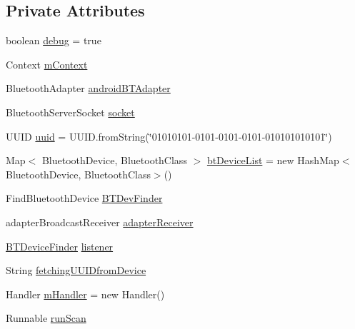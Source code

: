 \subsection*{Private Attributes}
\begin{DoxyCompactItemize}
\item 
boolean \hyperlink{classcom_1_1copelabs_1_1oiframework_1_1bt_1_1_bluetooth_manager_a51e8d0ab632d799f5b0a9b4136715b45}{debug} = true
\item 
Context \hyperlink{classcom_1_1copelabs_1_1oiframework_1_1bt_1_1_bluetooth_manager_a92b524343ac2cdf6f644661e899f80fc}{m\+Context}
\item 
Bluetooth\+Adapter \hyperlink{classcom_1_1copelabs_1_1oiframework_1_1bt_1_1_bluetooth_manager_a52d0ce55f573bd974f3badaf9e15ea21}{android\+B\+T\+Adapter}
\item 
Bluetooth\+Server\+Socket \hyperlink{classcom_1_1copelabs_1_1oiframework_1_1bt_1_1_bluetooth_manager_a76e2d36a98cc7630bffaa92c961dd8b3}{socket}
\item 
U\+U\+I\+D \hyperlink{classcom_1_1copelabs_1_1oiframework_1_1bt_1_1_bluetooth_manager_a952650efe65f696e04b4a3a780db7c87}{uuid} = U\+U\+I\+D.\+from\+String(\char`\"{}01010101-\/0101-\/0101-\/0101-\/010101010101\char`\"{})
\item 
Map$<$ Bluetooth\+Device, Bluetooth\+Class $>$ \hyperlink{classcom_1_1copelabs_1_1oiframework_1_1bt_1_1_bluetooth_manager_aabe213a55c84a108a9856ee520bec579}{bt\+Device\+List} = new Hash\+Map$<$Bluetooth\+Device, Bluetooth\+Class$>$()
\item 
Find\+Bluetooth\+Device \hyperlink{classcom_1_1copelabs_1_1oiframework_1_1bt_1_1_bluetooth_manager_a7d9392823dae98fc2b98356ecc6bd583}{B\+T\+Dev\+Finder}
\item 
adapter\+Broadcast\+Receiver \hyperlink{classcom_1_1copelabs_1_1oiframework_1_1bt_1_1_bluetooth_manager_a8df45a61c77f8b4f31313d9552f7f9d1}{adapter\+Receiver}
\item 
\hyperlink{interfacecom_1_1copelabs_1_1oiframework_1_1bt_1_1_b_t_device_finder}{B\+T\+Device\+Finder} \hyperlink{classcom_1_1copelabs_1_1oiframework_1_1bt_1_1_bluetooth_manager_a1bcff176cc3849a9015a66ff51165427}{listener}
\item 
String \hyperlink{classcom_1_1copelabs_1_1oiframework_1_1bt_1_1_bluetooth_manager_a5ffef03e0d8bd515388f9dae0132aa33}{fetching\+U\+U\+I\+Dfrom\+Device}
\item 
Handler \hyperlink{classcom_1_1copelabs_1_1oiframework_1_1bt_1_1_bluetooth_manager_aa50b04c88c27270038c9833ca45c7934}{m\+Handler} = new Handler()
\item 
Runnable \hyperlink{classcom_1_1copelabs_1_1oiframework_1_1bt_1_1_bluetooth_manager_a4586c54a7ee9e76c5ea8582dafa02aaa}{run\+Scan}
\end{DoxyCompactItemize}

